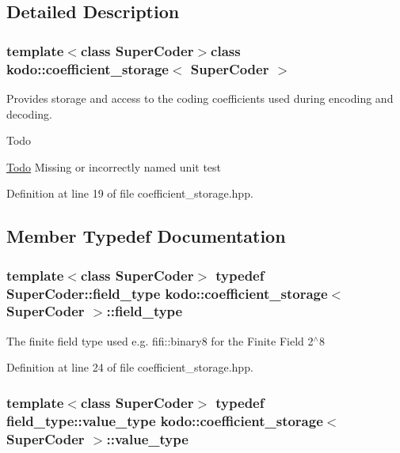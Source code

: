\subsection{Detailed Description}
\subsubsection*{template$<$class Super\-Coder$>$class kodo\-::coefficient\-\_\-storage$<$ Super\-Coder $>$}

Provides storage and access to the coding coefficients used during encoding and decoding. 

\begin{DoxyRefDesc}{Todo}
\item[\hyperlink{todo__todo000004}{Todo}]Missing or incorrectly named unit test\end{DoxyRefDesc}


Definition at line 19 of file coefficient\-\_\-storage.\-hpp.



\subsection{Member Typedef Documentation}
\hypertarget{classkodo_1_1coefficient__storage_ac326eea1a6bb406c53adbdb6d8e6355b}{
\subsubsection[{field\-\_\-type}]{\setlength{\rightskip}{0pt plus 5cm}template$<$class Super\-Coder$>$ typedef Super\-Coder\-::field\-\_\-type {\bf kodo\-::coefficient\-\_\-storage}$<$ Super\-Coder $>$\-::{\bf field\-\_\-type}}}\label{classkodo_1_1coefficient__storage_ac326eea1a6bb406c53adbdb6d8e6355b}




The finite field type used e.\-g. fifi\-::binary8 for the Finite Field 2$^\wedge$8 

Definition at line 24 of file coefficient\-\_\-storage.\-hpp.

\hypertarget{classkodo_1_1coefficient__storage_a20cb74e084e77c6c15b176e01f555b1c}{
\subsubsection[{value\-\_\-type}]{\setlength{\rightskip}{0pt plus 5cm}template$<$class Super\-Coder$>$ typedef field\-\_\-type\-::value\-\_\-type {\bf kodo\-::coefficient\-\_\-storage}$<$ Super\-Coder $>$\-::{\bf value\-\_\-type}}}\label{classkodo_1_1coefficient__storage_a20cb74e084e77c6c15b176e01f555b1c}





